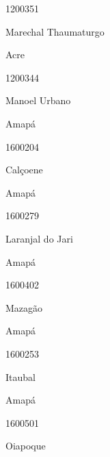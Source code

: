 \documentclass[
  letterpaper,
]{report}
\begin{document}
1200351

\n      

Marechal Thaumaturgo

\n    

\n    

\n      

Acre

\n      

1200344

\n      

Manoel Urbano

\n    

\n    

\n      

Amapá

\n      

1600204

\n      

Calçoene

\n    

\n    

\n      

Amapá

\n      

1600279

\n      

Laranjal do Jari

\n    

\n    

\n      

Amapá

\n      

1600402

\n      

Mazagão

\n    

\n    

\n      

Amapá

\n      

1600253

\n      

Itaubal

\n    

\n    

\n      

Amapá

\n      

1600501

\n      

Oiapoque

\n    

\n    
\end{document}
